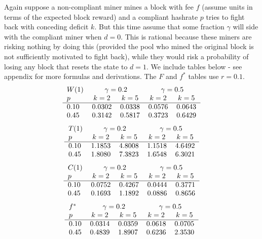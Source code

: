 \documentclass{article}%
\begin{document}
Again suppose a non-compliant miner mines a block with fee $f$ (assume units in
terms of the expected block reward) and a compliant hashrate $p$ tries to
fight back with conceding deficit $k.$ But this time assume that some fraction
$\gamma$ will side with the compliant miner when $d=0.$  This is rational
because these miners are risking nothing by doing this (provided the pool who
mined the original block is not sufficiently motivated to fight back), while
they would risk a probability of losing any block that resets the state to $d=1$. We include tables below - see appendix for more formulas and derivations.  The $F$ and $f^{\ast}$
tables use $r=0.1$.%
\[
\begin{tabular}[c]{lcccc}
$W(1)$ & \multicolumn{2}{c}{$\gamma=0.2$} & \multicolumn{2}{c}{$\gamma=0.5$}\\
$p$ & $k=2$ & $k=5$ & $k=2$ & $k=5$\\ \hline
$0.10$ & $0.0302$ & $0.0338$ & $0.0576$ & $0.0643$\\
$0.45$ & $0.3142$ & $0.5817$ & $0.3723$ & $0.6429$\\
\end{tabular}
\]
\[
\begin{tabular}[c]{lcccc}
$T(1)$ & \multicolumn{2}{c}{$\gamma=0.2$} & \multicolumn{2}{c}{$\gamma=0.5$}\\
$p$ & $k=2$ & $k=5$ & $k=2$ & $k=5$\\ \hline
$0.10$ & $1.1853$ & $4.8008$ & $1.1518$ & $4.6492$\\
$0.45$ & $1.8080$ & $7.3823$ & $1.6548$ & $6.3021$\\
\end{tabular}
\]
\[
\begin{tabular}[c]{lcccc}
$C(1)$ & \multicolumn{2}{c}{$\gamma=0.2$} & \multicolumn{2}{c}{$\gamma=0.5$}\\
$p$ & $k=2$ & $k=5$ & $k=2$ & $k=5$\\ \hline
$0.10$ & $0.0752$ & $0.4267$ & $0.0444$ & $0.3771$\\
$0.45$ & $0.1693$ & $1.1892$ & $0.0886$ & $0.8656$\\
\end{tabular}
\]
\[
\begin{tabular}[c]{lcccc}
$f^{\ast}$ & \multicolumn{2}{c}{$\gamma=0.2$} & \multicolumn{2}{c}{$\gamma=0.5$}\\
$p$ & $k=2$ & $k=5$ & $k=2$ & $k=5$\\ \hline
$0.10$ & $0.0314$ & $0.0359$ & $0.0618$ & $0.0705$\\
$0.45$ & $0.4839$ & $1.8907$ & $0.6236$ & $2.3530$\\
\end{tabular}
\]
\end{document}
